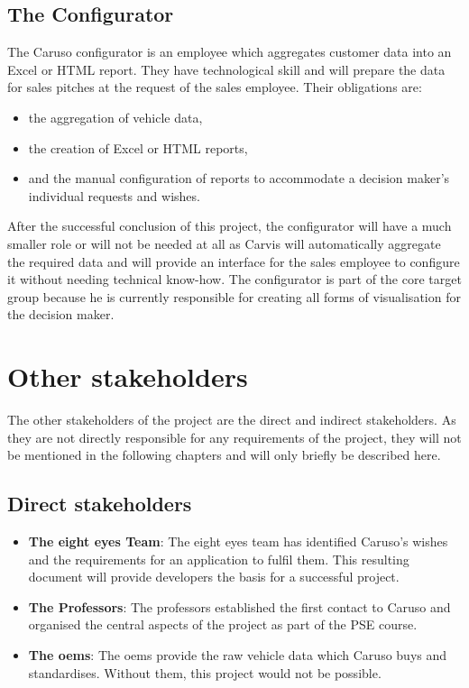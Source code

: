 \subsection{The Configurator}
The Caruso configurator is an employee which aggregates customer data into an Excel or HTML report. They have technological skill and will prepare the data for sales pitches at the request of the sales employee. Their obligations are:
\begin{itemize}
  \item the aggregation of vehicle data,
  \item the creation of Excel or HTML reports,
  \item and the manual configuration of reports to accommodate a decision maker's individual requests and wishes.
\end{itemize}
After the successful conclusion of this project, the configurator will have a much smaller role or will not be needed at all as Carvis will automatically aggregate the required data and will provide an interface for the sales employee to configure it without needing technical know-how. The configurator is part of the core target group because he is currently responsible for creating all forms of visualisation for the decision maker.

\section{Other \Glspl{stakeholder}}
The other \glspl{stakeholder} of the project are the direct and indirect \glspl{stakeholder}. As they are not directly responsible for any requirements of the project, they will not be mentioned in the following chapters and will only briefly be described here.

\subsection{Direct \Glspl{stakeholder}}
\begin{itemize}
  \item \textbf{The eight eyes Team}: The eight eyes team has identified Caruso's wishes and the requirements for an application to fulfil them. This resulting document will provide developers the basis for a successful project.
  \item \textbf{The Professors}: The professors established the first contact to Caruso and organised the central aspects of the project as part of the PSE course.
  \item \textbf{The \glspl{oem}}: The \glspl{oem} provide the raw vehicle data which Caruso buys and standardises. Without them, this project would not be possible.
\end{itemize}

